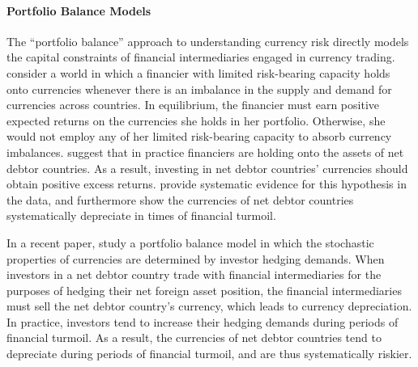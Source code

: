 \documentclass{ar-1col}
\begin{document}
\paragraph*{Portfolio Balance Models} The  ``portfolio balance'' approach to understanding currency risk directly models the capital constraints of financial intermediaries engaged in currency trading. \citet{GabaixMaggiori2015} consider a world in which a financier with limited risk-bearing capacity holds onto currencies whenever there is an imbalance in the supply and demand for currencies across countries. In equilibrium, the financier must earn positive expected returns on the currencies she holds in her portfolio. Otherwise, she would not employ any of her limited risk-bearing capacity to absorb currency imbalances. \citet{GabaixMaggiori2015} suggest that in practice financiers are holding onto the assets of net debtor countries. As a result, investing in net debtor countries' currencies should obtain positive excess returns. \citet{DellaCorteetal2009} provide systematic evidence for this hypothesis in the data, and furthermore show the currencies of net debtor countries systematically depreciate in times of financial turmoil.

In a recent paper, \citet{LiaoZhang2020} study a portfolio balance model in which the stochastic properties of currencies are determined by investor hedging demands. When investors in a net debtor country trade with financial intermediaries for the purposes of hedging their net foreign asset position, the financial intermediaries must sell the net debtor country's currency, which leads to currency depreciation. In practice, investors tend to increase their hedging demands during periods of financial turmoil. As a result, the currencies of net debtor countries tend to depreciate during periods of financial turmoil, and are thus systematically riskier.
 
\end{document}
